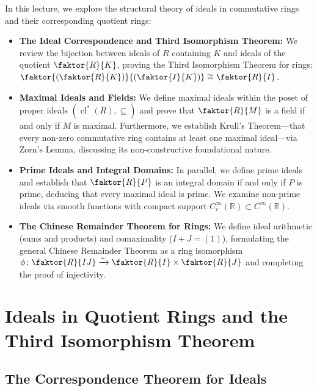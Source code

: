 \begin{overview}
In this lecture, we explore the structural theory of ideals in commutative rings and their corresponding quotient rings:
\begin{itemize}
    \item \textbf{The Ideal Correspondence and Third Isomorphism Theorem:} We review the bijection between ideals of $R$ containing $K$ and ideals of the quotient $\faktor{R}{K}$, proving the Third Isomorphism Theorem for rings: $\faktor{\left(\faktor{R}{K}\right)}{\left(\faktor{I}{K}\right)} \cong \faktor{R}{I}$.
    \item \textbf{Maximal Ideals and Fields:} We define maximal ideals within the poset of proper ideals $(\operatorname{cl}^*(R), \subseteq)$ and prove that $\faktor{R}{M}$ is a field if and only if $M$ is maximal. Furthermore, we establish Krull's Theorem---that every non-zero commutative ring contains at least one maximal ideal---via Zorn's Lemma, discussing its non-constructive foundational nature.
    \item \textbf{Prime Ideals and Integral Domains:} In parallel, we define prime ideals and establish that $\faktor{R}{P}$ is an integral domain if and only if $P$ is prime, deducing that every maximal ideal is prime. We examine non-prime ideals via smooth functions with compact support $C_c^\infty(\mathbb{R}) \subset C^\infty(\mathbb{R})$.
    \item \textbf{The Chinese Remainder Theorem for Rings:} We define ideal arithmetic (sums and products) and comaximality ($I + J = (1)$), formulating the general Chinese Remainder Theorem as a ring isomorphism $\phi \colon \faktor{R}{IJ} \xrightarrow{\sim} \faktor{R}{I} \times \faktor{R}{J}$ and completing the proof of injectivity.
\end{itemize}
\end{overview}

\section{Ideals in Quotient Rings and the Third Isomorphism Theorem}

\subsection{The Correspondence Theorem for Ideals}


